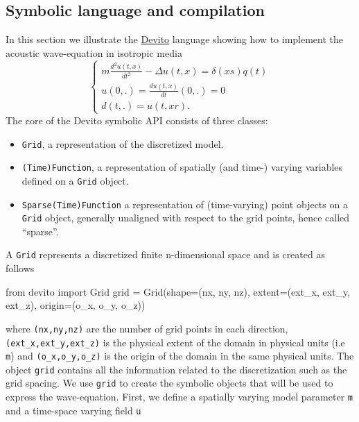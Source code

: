 \documentclass[conference]{IEEEtran}
\begin{document}
\subsection{Symbolic language and
compilation}\label{symbolic-language-and-compilation}

In this section we illustrate the \href{https://github.com/devitocodes/devito}{Devito} language showing how to implement
the acoustic wave-equation in isotropic media
%
\begin{equation}
\begin{cases}
 m \frac{d^2 u(t, x)}{dt^2} - \Delta u(t, x) = \delta(xs) q(t) \\
 u(0, .) = \frac{d u(t, x)}{dt}(0, .) = 0 \\
 d(t, .) = u(t, xr).
 \end{cases}
\label{acou}
\end{equation}
%
 The core of the Devito
symbolic API consists of three classes:

\begin{itemize}
\itemsep1pt\parskip0pt
\item
  \texttt{Grid}, a representation of the discretized model.
\item
  \texttt{(Time)Function}, a representation of spatially (and time-)
  varying variables defined on a \texttt{Grid} object.
\item
  \texttt{Sparse(Time)Function} a representation of (time-varying) point
  objects on a \texttt{Grid} object, generally unaligned with respect to
  the grid points, hence called ``sparse''.
\end{itemize}

A \texttt{Grid} represents a discretized finite n-dimensional space and
is created as follows

\begin{python}
from devito import Grid
grid = Grid(shape=(nx, ny, nz),
            extent=(ext_x, ext_y, ext_z),
            origin=(o_x, o_y, o_z))
\end{python}

where \texttt{(nx,\phantom{\ }ny,\phantom{\ }nz)} are the number of grid
points in each direction,
\texttt{(ext\_x,\phantom{\ }ext\_y,\phantom{\ }ext\_z)} is the physical
extent of the domain in physical units (i.e \texttt{m}) and
\texttt{(o\_x,\phantom{\ }o\_y,\phantom{\ }o\_z)} is the origin of the
domain in the same physical units. The object \texttt{grid} contains all
the information related to the discretization such as the grid spacing.
We use \texttt{grid} to create the symbolic objects that will be used to
express the wave-equation. First, we define a spatially varying model
parameter \texttt{m} and a time-space varying field \texttt{u}
\end{document}
